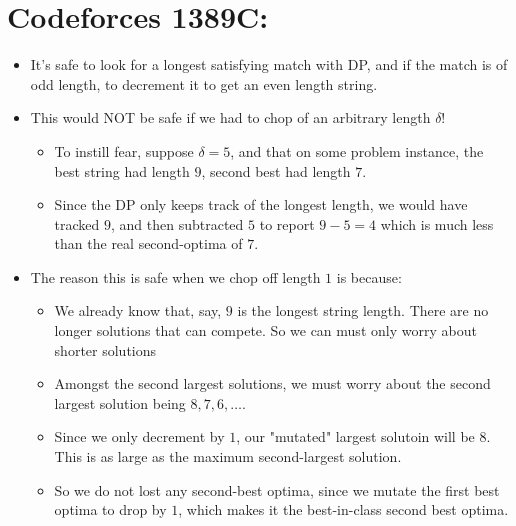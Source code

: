 \documentclass[14pt]{report}
\begin{document}
\section{Codeforces 1389C:}
\begin{itemize}
\item It's safe to look for a longest satisfying match with DP, and if the
    match is of odd length, to decrement it to get an even length string.
\item This would NOT be safe if we had to chop of an arbitrary length $\delta$!
    \begin{itemize}
        \item To instill fear, suppose $\delta = 5$,
            and that on some problem instance, the best string had length $9$, second best had length $7$.
        \item Since the DP only keeps track of the longest length, we would
            have tracked $9$, and then subtracted $5$ to report $9-5=4$ which
            is much less than the real second-optima of $7$.
    \end{itemize}
\item The reason this is safe when we chop off length $1$ is because:
    \begin{itemize}
            \item We already know that, say, $9$ is the longest string length.
                There are no longer solutions that can compete. So we can must
                only worry about shorter solutions
            \item Amongst the second largest solutions, we must worry about the second largest solution being $8, 7, 6, \dots$.
            \item Since we only decrement by $1$, our "mutated" largest solutoin will be $8$. This is as large as the 
                maximum second-largest solution.
            \item So we do not lost any second-best optima, since we mutate the first best optima to drop by $1$, which makes it
                the best-in-class second best optima.
    \end{itemize}
\end{itemize}



\end{document}
